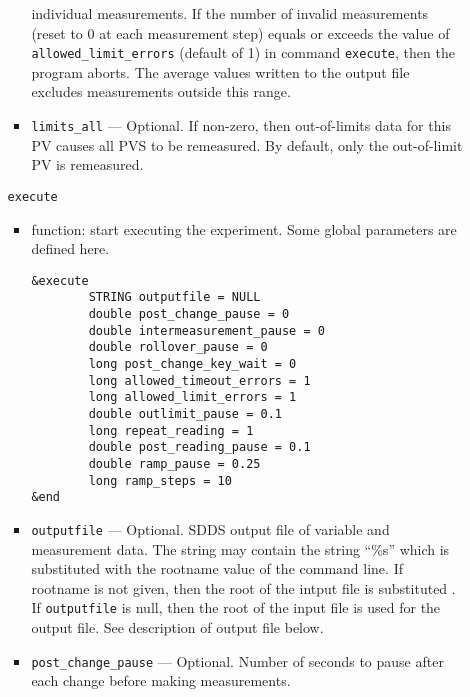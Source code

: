 \begin{itemize}
\begin{itemize}
\begin{itemize}
                individual measurements. If the number of invalid measurements (reset to 0 at each
                measurement step) equals or exceeds the value
                of {\verb+allowed_limit_errors+} (default of 1) in command {\verb+execute+}, then the program aborts.
                The average values written to the output file excludes measurements outside this range.
        \item {\verb+limits_all+} --- Optional. If non-zero, then out-of-limits data for this PV causes 
                all PVS to be remeasured. By default, only the out-of-limit PV is remeasured.
\end{itemize}

\begin{latexonly}
\newpage\begin{center}{\Large \verb+execute+}\end{center}
\end{latexonly}
\begin{htmlonly}
\item {\Large \verb+execute+}
\end{htmlonly}
\begin{itemize}
        \item function: start executing the experiment. Some global parameters are defined here.
\begin{verbatim}
&execute
        STRING outputfile = NULL
        double post_change_pause = 0
        double intermeasurement_pause = 0
        double rollover_pause = 0
        long post_change_key_wait = 0
        long allowed_timeout_errors = 1
        long allowed_limit_errors = 1
        double outlimit_pause = 0.1
        long repeat_reading = 1
        double post_reading_pause = 0.1
        double ramp_pause = 0.25
        long ramp_steps = 10
&end
\end{verbatim}
        \item {\verb+outputfile+} --- Optional. SDDS output file of variable and measurement data. The string
                may contain the string ``\%s'' which is substituted with the rootname value
                of the command line. If rootname is not given, then the root of the intput file
                is substituted . If {\verb+outputfile+} is null, then the root of the input file
                is used for the output file. See description of output file below.
        \item {\verb+post_change_pause+} ---  Optional. Number of seconds to pause after each change before
                making measurements.

\end{itemize}
\end{itemize}
\end{itemize}
